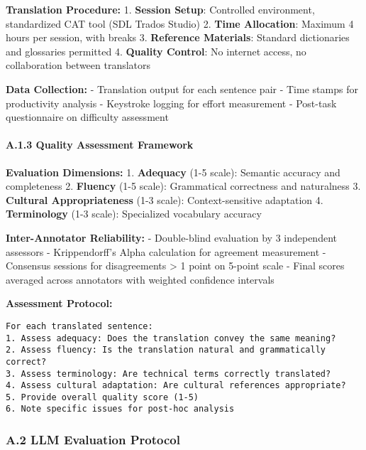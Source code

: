 \documentclass[12pt,a4paper]{article}
\begin{document}
{{{{{\textbf{Translation Procedure:} 1. \textbf{Session Setup}: Controlled
environment, standardized CAT tool (SDL Trados Studio) 2. \textbf{Time
Allocation}: Maximum 4 hours per session, with breaks 3.
\textbf{Reference Materials}: Standard dictionaries and glossaries
permitted 4. \textbf{Quality Control}: No internet access, no
collaboration between translators

\textbf{Data Collection:} - Translation output for each sentence pair -
Time stamps for productivity analysis - Keystroke logging for effort
measurement - Post-task questionnaire on difficulty assessment

\hypertarget{a.1.3-quality-assessment-framework}{%
\paragraph{A.1.3 Quality Assessment
Framework}\label{a.1.3-quality-assessment-framework}}

\textbf{Evaluation Dimensions:} 1. \textbf{Adequacy} (1-5 scale):
Semantic accuracy and completeness 2. \textbf{Fluency} (1-5 scale):
Grammatical correctness and naturalness 3. \textbf{Cultural
Appropriateness} (1-3 scale): Context-sensitive adaptation 4.
\textbf{Terminology} (1-3 scale): Specialized vocabulary accuracy

\textbf{Inter-Annotator Reliability:} - Double-blind evaluation by 3
independent assessors - Krippendorff's Alpha calculation for agreement
measurement - Consensus sessions for disagreements \textgreater{} 1
point on 5-point scale - Final scores averaged across annotators with
weighted confidence intervals

\textbf{Assessment Protocol:}

\begin{verbatim}
For each translated sentence:
1. Assess adequacy: Does the translation convey the same meaning?
2. Assess fluency: Is the translation natural and grammatically correct?
3. Assess terminology: Are technical terms correctly translated?
4. Assess cultural adaptation: Are cultural references appropriate?
5. Provide overall quality score (1-5)
6. Note specific issues for post-hoc analysis
\end{verbatim}

\hypertarget{a.2-llm-evaluation-protocol}{%
\subsubsection{A.2 LLM Evaluation
Protocol}\label{a.2-llm-evaluation-protocol}}

}}}}}
\end{document}

